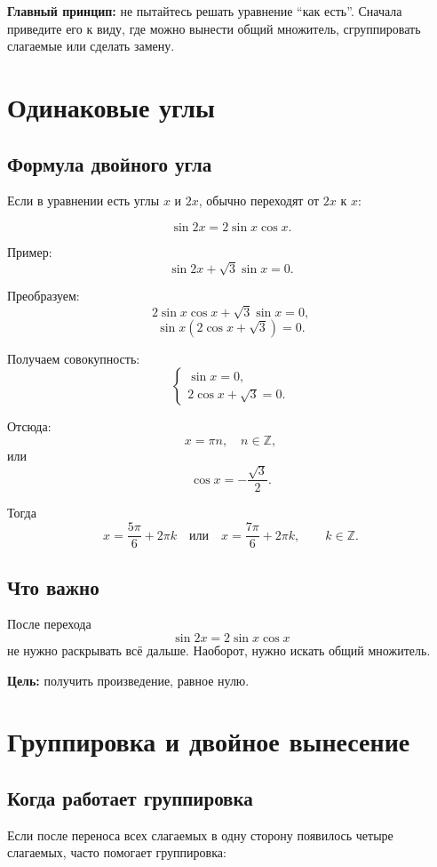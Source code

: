 \documentclass[a4paper,12pt]{article}
\newcommand{\important}[1]{\textcolor{darkaccent}{\textbf{#1}}}
\begin{document}
\important{Главный принцип:} не пытайтесь решать уравнение ``как есть''. Сначала приведите его к виду, где можно вынести общий множитель, сгруппировать слагаемые или сделать замену.

\section{Одинаковые углы}

\subsection{Формула двойного угла}

Если в уравнении есть углы $x$ и $2x$, обычно переходят от $2x$ к $x$:

\[
\sin 2x=2\sin x\cos x.
\]

Пример:
\[
\sin 2x+\sqrt3\sin x=0.
\]

Преобразуем:
\[
2\sin x\cos x+\sqrt3\sin x=0,
\]
\[
\sin x(2\cos x+\sqrt3)=0.
\]

Получаем совокупность:
\[
\begin{cases}
\sin x=0,\\
2\cos x+\sqrt3=0.
\end{cases}
\]

Отсюда:
\[
x=\pi n,\quad n\in\mathbb Z,
\]
или
\[
\cos x=-\frac{\sqrt3}{2}.
\]

Тогда
\[
x=\frac{5\pi}{6}+2\pi k
\quad\text{или}\quad
x=\frac{7\pi}{6}+2\pi k,
\qquad k\in\mathbb Z.
\]

\subsection{Что важно}

После перехода
\[
\sin 2x=2\sin x\cos x
\]
не нужно раскрывать всё дальше. Наоборот, нужно искать общий множитель.

\important{Цель:} получить произведение, равное нулю.

\section{Группировка и двойное вынесение}

\subsection{Когда работает группировка}

Если после переноса всех слагаемых в одну сторону появилось четыре слагаемых, часто помогает группировка:
\end{document}
